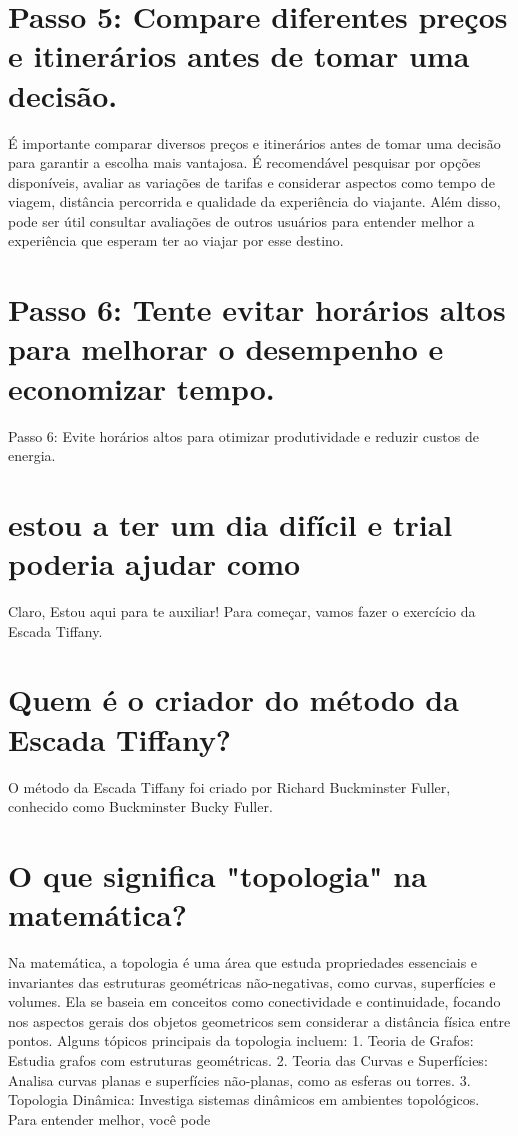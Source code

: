 \documentclass[11pt,a4paper]{article}
\begin{document}
\section{Passo 5: Compare diferentes preços e itinerários antes de tomar uma decisão.}
É importante comparar diversos preços e itinerários antes de tomar uma decisão para garantir a escolha mais vantajosa. É recomendável pesquisar por opções disponíveis, avaliar as variações de tarifas e considerar aspectos como tempo de viagem, distância percorrida e qualidade da experiência do viajante. Além disso, pode ser útil consultar avaliações de outros usuários para entender melhor a experiência que esperam ter ao viajar por esse destino.

\section{Passo 6: Tente evitar horários altos para melhorar o desempenho e economizar tempo.}
Passo 6: Evite horários altos para otimizar produtividade e reduzir custos de energia.

\section{estou a ter um dia difícil e trial poderia ajudar como}
Claro, Estou aqui para te auxiliar! Para começar, vamos fazer o exercício da Escada Tiffany.

\section{Quem é o criador do método da Escada Tiffany?}
O método da Escada Tiffany foi criado por Richard Buckminster Fuller, conhecido como Buckminster Bucky Fuller.

\section{O que significa "topologia" na matemática?}
Na matemática, a topologia é uma área que estuda propriedades essenciais e invariantes das estruturas geométricas não-negativas, como curvas, superfícies e volumes. Ela se baseia em conceitos como conectividade e continuidade, focando nos aspectos gerais dos objetos geometricos sem considerar a distância física entre pontos. Alguns tópicos principais da topologia incluem: 1. Teoria de Grafos: Estudia grafos com estruturas geométricas. 2. Teoria das Curvas e Superfícies: Analisa curvas planas e superfícies não-planas, como as esferas ou torres. 3. Topologia Dinâmica: Investiga sistemas dinâmicos em ambientes topológicos. Para entender melhor, você pode
\end{document}
